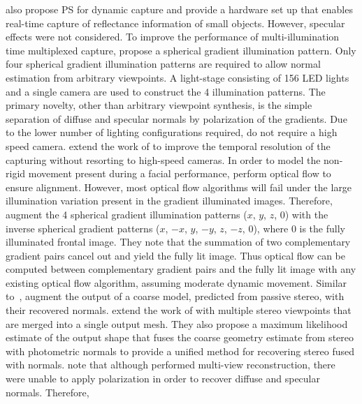 \citet{malzbender2006surface} also propose PS for dynamic
capture and provide a hardware set up that enables real-time capture
of reflectance information of small objects. However, specular effects
were not considered.
To improve the performance of multi-illumination time multiplexed
capture, \citet{ma2007rapid} propose a spherical gradient illumination pattern.
Only four spherical gradient illumination patterns are required to allow
normal estimation from arbitrary viewpoints. A light-stage consisting of 156
LED lights and a single camera are used to construct the 4 illumination
patterns. The primary novelty, other than arbitrary viewpoint synthesis, is
the simple separation of diffuse and specular normals by polarization of the
gradients. Due to the lower number of lighting configurations required,
\citet{ma2007rapid} do not require a high speed camera.
\citet{wilson2010temporal} extend the work of \citet{ma2007rapid} to
improve the temporal resolution of the capturing without resorting to
high-speed cameras. In order to model the non-rigid movement present
during a facial performance, \citet{wilson2010temporal} perform optical
flow to ensure alignment. However, most optical flow algorithms will fail under
the large illumination variation present in the gradient illuminated images.
Therefore, \citet{wilson2010temporal} augment the 4 spherical gradient
illumination patterns ($x$, $y$, $z$, $0$) with the inverse spherical
gradient patterns ($x$, $-x$, $y$, $-y$, $z$, $-z$, $0$), where $0$ is the
fully illuminated frontal image. They note that the summation of two
complementary gradient pairs cancel out and yield the fully lit image. Thus
optical flow can be computed between complementary gradient pairs and the fully
lit image with any existing optical flow algorithm, assuming moderate dynamic
movement. Similar to~\cite{ma2007rapid,debevec2000acquiring,weyrich2006analysis},
\citet{wilson2010temporal} augment the output of a coarse model, predicted
from passive stereo, with their recovered normals.
\citet{fyffe2011comprehensive} extend the work of \citet{wilson2010temporal}
with multiple stereo viewpoints that are merged into a single output mesh.
They also propose a maximum likelihood estimate of the output shape
that fuses the coarse geometry estimate from stereo with photometric normals
to provide a unified method for recovering stereo fused with normals.
\citet{ghosh2011multiview} note that although \citet{fyffe2011comprehensive}
performed multi-view reconstruction, there were unable to apply polarization
in order to recover diffuse and specular normals. Therefore,
